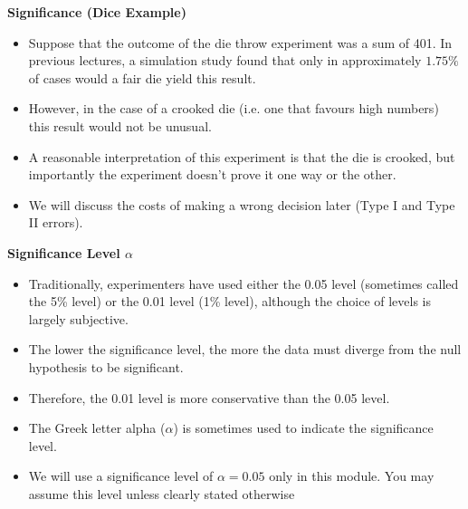 


\noindent \textbf{Significance (Dice Example)}
\begin{itemize}
\item Suppose that the outcome of the die throw experiment was a sum of 401. In previous lectures, a simulation study found that only in approximately $1.75\%$ of cases would a fair die yield this result.
\item However, in the case of a crooked die (i.e. one that favours high numbers) this result would not be unusual.
\item A reasonable interpretation of this experiment is that the die is crooked, but importantly the experiment doesn't prove it one way or the other.
\item We will discuss the costs of making a wrong decision later (Type I and Type II errors).
\end{itemize}


\noindent \textbf{Significance Level $\alpha$}

\begin{itemize}
\item Traditionally, experimenters have used either the 0.05 level (sometimes called the 5\% level) or the 0.01 level (1\% level), although the choice of levels is largely subjective.  \item The lower the significance level, the more the data must diverge from the null hypothesis to be significant. \item Therefore, the 0.01 level is more conservative than the 0.05 level. \item The Greek letter alpha ($\alpha$) is sometimes used to indicate the significance level. \item We will use a significance level of $\alpha =0.05$ only in this module. You may assume this level unless clearly stated otherwise
\end{itemize}



